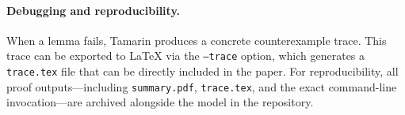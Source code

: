 \paragraph{Debugging and reproducibility.} When a lemma fails, Tamarin produces a concrete counterexample trace. This trace can be exported to LaTeX via the \texttt{--trace} option, which generates a \texttt{trace.tex} file that can be directly included in the paper. For reproducibility, all proof outputs—including \texttt{summary.pdf}, \texttt{trace.tex}, and the exact command-line invocation—are archived alongside the model in the repository.


